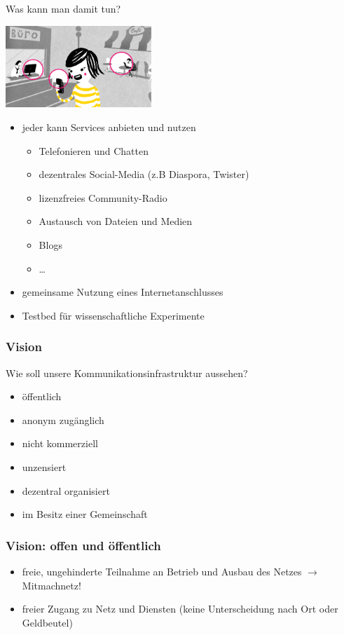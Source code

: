 \documentclass[10pt]{beamer}
\begin{document}
\begin{frame}{Was kann man damit tun?}
	\vfill
	\begin{center}
		\includegraphics[width=5.5cm]{images/verbindet}
	\end{center}
	
	\begin{itemize}[<+->]
		\item jeder kann Services anbieten und nutzen
		\begin{itemize}
			\item Telefonieren und Chatten
			\item dezentrales Social-Media (z.B Diaspora, Twister)
			\item lizenzfreies Community-Radio
			\item Austausch von Dateien und Medien
			\item Blogs
			\item \ldots
		\end{itemize}
		\item gemeinsame Nutzung eines Internetanschlusses
		\item Testbed für wissenschaftliche Experimente
	\end{itemize}
	\vfill
\end{frame}

\begin{frame}
	\frametitle{Vision}
	
	Wie soll unsere Kommunikationsinfrastruktur aussehen?
	
	\begin{itemize}[<+->]
		\item öffentlich
		\item anonym zugänglich
		\item nicht kommerziell
		\item unzensiert
		\item dezentral organisiert
		\item im Besitz einer Gemeinschaft
	\end{itemize}
\end{frame}

\begin{frame}
	\frametitle{Vision: offen und öffentlich}
	
	\begin{itemize}[<+->]
		\item freie, ungehinderte Teilnahme an Betrieb und Ausbau des Netzes $\rightarrow$ Mitmachnetz!
		\item freier Zugang zu Netz und Diensten (keine Unterscheidung nach Ort oder Geldbeutel)
	\end{itemize}
\end{frame}
\end{document}
